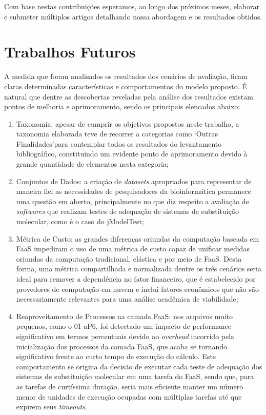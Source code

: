 \documentclass[english,brazilian]{UNISINOSmonografia} %
\begin{document}
Com base nestas contribuições esperamos, ao longo dos próximos meses, elaborar e submeter múltiplos artigos detalhando nossa abordagem e os resultados obtidos.



\section{Trabalhos Futuros}


A medida que foram analisados os resultados dos cenários de avaliação, ficam claras determinadas características e comportamentos do modelo proposto.
%
É natural que dentre as descobertas reveladas pela análise dos resultados existam pontos de melhoria e aprimoramento, sendo os principais elencados abaixo:

\begin{enumerate}[label={\arabic*)}]
	
	\item Taxonomia: apesar de cumprir os objetivos propostos neste trabalho, a taxonomia elaborada teve de recorrer a categorias como \textquoteleft Outras Finalidades\textquoteright para contemplar todos os resultados do levantamento bibliográfico, constituindo um evidente ponto de aprimoramento devido à grande quantidade de elementos nesta categoria;
	
	\item Conjuntos de Dados: a criação de \textit{datasets} apropriados para representar de maneira fiel as necessidades de pesquisadores da bioinformática permanece uma questão em aberto, principalmente no que diz respeito a avaliação de \textit{softwares} que realizam testes de adequação de sistemas de substituição molecular, como é o caso do jModelTest;
	
	\item Métrica de Custo: as grandes diferenças oriundas da computação baseada em FaaS impediram o uso de uma métrica de custo capaz de unificar medidas oriundas da computação tradicional, elástica e por meio de FaaS.
	Desta forma, uma métrica compartilhada e normalizada dentre os três cenários seria ideal para remover a dependência no fator financeiro, que é estabelecido por provedores de computação em nuvem e inclui fatores econômicos que não são necessariamente relevantes para uma análise acadêmica de viabilidade;
	
	\item Reaproveitamento de Processos na camada FaaS: nos arquivos muito pequenos, como o 01-aP6, foi detectado um impacto de performance significativo em termos percentuais devido ao \textit{overhead} incorrido pela inicialização dos processos da camada FaaS, que acaba se tornando significativo frente ao curto tempo de execução do cálculo.
	Este comportamento se origina da decisão de executar cada teste de adequação dos sistemas de substituição molecular em uma tarefa do FaaS, sendo que, para as tarefas de curtíssima duração, seria mais eficiente manter um número menor de unidades de execução ocupadas com múltiplas tarefas até que expirem seus \textit{timeouts}.
	

\end{enumerate}
\end{document}
